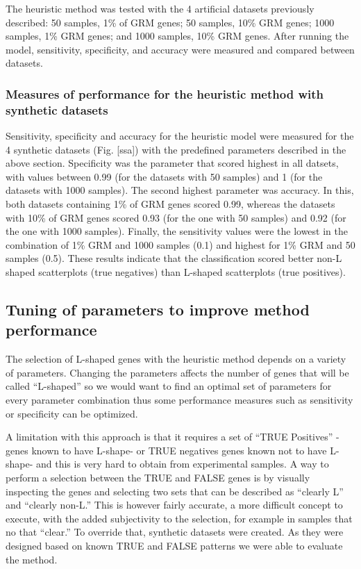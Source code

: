 \documentclass[10pt,letterpaper]{article}
\begin{document}
The heuristic method was tested with the 4 artificial datasets
previously described: 50 samples, 1\% of GRM genes; 50 samples, 10\% GRM
genes; 1000 samples, 1\% GRM genes; and 1000 samples, 10\% GRM genes.
After running the model, sensitivity, specificity, and accuracy were
measured and compared between datasets.

\hypertarget{measures-of-performance-for-the-heuristic-method-with-synthetic-datasets}{%
\subsubsection{Measures of performance for the heuristic method with
synthetic
datasets}\label{measures-of-performance-for-the-heuristic-method-with-synthetic-datasets}}

Sensitivity, specificity and accuracy for the heuristic model were
measured for the 4 synthetic datasets (Fig. {[}ssa{]}) with the
predefined parameters described in the above section. Specificity was
the parameter that scored highest in all datsets, with values between
0.99 (for the datasets with 50 samples) and 1 (for the datasets with
1000 samples). The second highest parameter was accuracy. In this, both
datasets containing 1\% of GRM genes scored 0.99, whereas the datasets
with 10\% of GRM genes scored 0.93 (for the one with 50 samples) and
0.92 (for the one with 1000 samples). Finally, the sensitivity values
were the lowest in the combination of 1\% GRM and 1000 samples (0.1) and
highest for 1\% GRM and 50 samples (0.5). These results indicate that
the classification scored better non-L shaped scatterplots (true
negatives) than L-shaped scatterplots (true positives).

\hypertarget{tuning-of-parameters-to-improve-method-performance}{%
\subsection{Tuning of parameters to improve method
performance}\label{tuning-of-parameters-to-improve-method-performance}}

The selection of L-shaped genes with the heuristic method depends on a
variety of parameters. Changing the parameters affects the number of
genes that will be called ``L-shaped'' so we would want to find an
optimal set of parameters for every parameter combination thus some
performance measures such as sensitivity or specificity can be
optimized.

A limitation with this approach is that it requires a set of ``TRUE
Positives'' -genes known to have L-shape- or TRUE negatives genes known
not to have L-shape- and this is very hard to obtain from experimental
samples. A way to perform a selection between the TRUE and FALSE genes
is by visually inspecting the genes and selecting two sets that can be
described as ``clearly L'' and ``clearly non-L.'' This is however fairly
accurate, a more difficult concept to execute, with the added
subjectivity to the selection, for example in samples that no that
``clear.'' To override that, synthetic datasets were created. As they
were designed based on known TRUE and FALSE patterns we were able to
evaluate the method.
\end{document}
